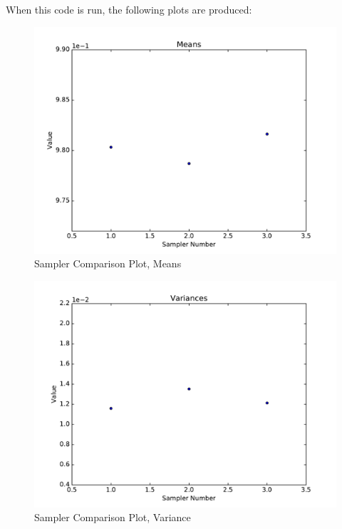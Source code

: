 When this code is run, the following plots are produced:
\begin{figure}[h!]
  \centering
  \includegraphics[width=0.7\linewidth]{../../tests/framework/user_guide/StatisticalAnalysis/comparingSamplers/meanPlotter_scatter}
  \caption{Sampler Comparison Plot, Means}
\end{figure}
\begin{figure}[h!]
  \centering
  \includegraphics[width=0.7\linewidth]{../../tests/framework/user_guide/StatisticalAnalysis/comparingSamplers/varPlotter_scatter}
  \caption{Sampler Comparison Plot, Variance}
\end{figure}



